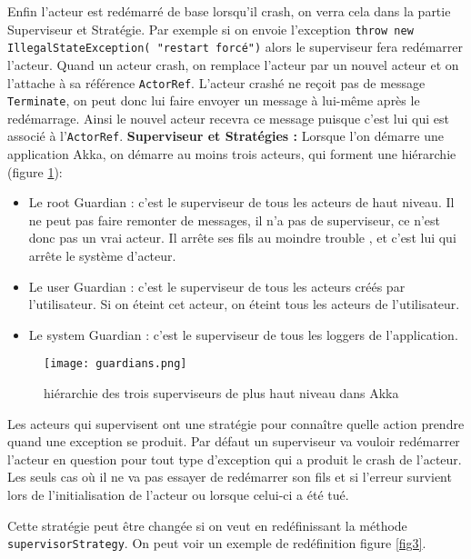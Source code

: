 \documentclass[11pt, a4paper]{article}
\begin{document}
\par Enfin l'acteur est redémarré de base lorsqu'il crash, on verra cela dans la partie Superviseur et Stratégie. Par exemple si on envoie l'exception \texttt{throw new IllegalStateException( "restart forcé")} alors le superviseur fera redémarrer l'acteur. Quand un acteur crash, on remplace l'acteur par un nouvel acteur et on l'attache à sa référence \verb!ActorRef!. L'acteur crashé ne reçoit pas de message \verb!Terminate!, on peut donc lui faire envoyer un message à lui-même après le redémarrage. Ainsi le nouvel acteur recevra ce message puisque c'est lui qui est associé à l'\texttt{ActorRef}.
\newline
\newline
\textbf{Superviseur et Stratégies :}
Lorsque l'on démarre une application Akka, on démarre au moins trois acteurs, qui forment une hiérarchie (figure \ref{fig2}): 
\begin{itemize}
\item Le root Guardian : c'est le superviseur de tous les acteurs de haut niveau. Il ne peut pas faire remonter de messages, il n'a pas de superviseur, ce n'est donc pas un vrai acteur. Il arrête ses fils  au moindre trouble \cite{akka}, et c'est lui qui arrête le système d'acteur.
\item Le user Guardian : c'est le superviseur de tous les acteurs créés par l'utilisateur. Si on éteint cet acteur, on éteint tous les acteurs de l'utilisateur.
\item Le system Guardian : c'est le superviseur de tous les loggers de l'application.
\newline
\end{itemize}

\begin{figure}
\centering
\texttt{[image: guardians.png]}
\caption{hiérarchie des trois superviseurs de plus haut niveau dans Akka \cite{akka}}
\label{fig2}
\end{figure}

\par Les acteurs qui supervisent ont une stratégie pour connaître  quelle action prendre quand une exception se produit. Par défaut un superviseur va vouloir redémarrer l'acteur en question pour tout type d'exception qui a produit le crash de l'acteur. Les seuls cas où il ne va pas essayer de redémarrer son fils et si l'erreur survient lors de l'initialisation de l'acteur ou lorsque celui-ci a été tué.
\par Cette stratégie peut être changée si on veut en redéfinissant la méthode \texttt{supervisorStrategy}. On peut voir un exemple de redéfinition figure \ref{fig3}.
\end{document}
